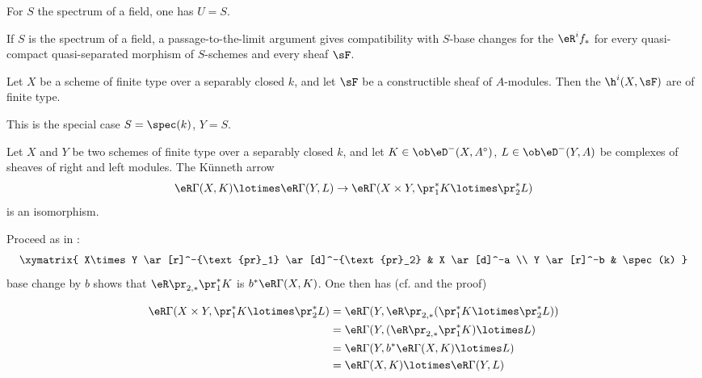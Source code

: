 For $S$ the spectrum of a field, one has $U=S$.

If $S$ is the spectrum of a field, a passage-to-the-limit argument gives
compatibility with $S$-base changes for the $\eR^i f_\ast$ for every
quasi-compact quasi-separated morphism of $S$-schemes and every sheaf $\sF$.






\begin{corollary_}\label{VII:1-10}
Let $X$ be a scheme of finite type over a separably closed $k$, and let
$\sF$ be a constructible sheaf of $A$-modules. Then the $\h^i(X,\sF)$ are of
finite type.
\end{corollary_}

This is the special case $S=\spec(k)$, $Y=S$.

\begin{corollary_}\label{VII:1-11}
Let $X$ and $Y$ be two schemes of finite type over a separably closed $k$,
and let $K\in \ob\eD^-(X,A^\circ)$,
$L\in \ob\eD^-(Y,A)$ be complexes of sheaves of right and left modules. The
K\"unneth arrow
\[
  \eR \Gamma(X,K) \lotimes \eR \Gamma(Y,L) \to \eR\Gamma(X\times Y,\pr_1^\ast K \lotimes \pr_2^\ast L)
\]
is an isomorphism.
\end{corollary_}

Proceed as in :
\[\xymatrix{
  X\times Y \ar[r]^-{\text{pr}_1} \ar[d]^-{\text{pr}_2}
    & X \ar[d]^-a \\
  Y \ar[r]^-b
    & \spec(k)
}\]
base change by $b$ shows that $\eR\pr_{2,\ast}{} \pr_1^\ast K$ is
$b^\ast \eR\Gamma(X,K)$. One then has (cf.
 and the proof)

\begin{align*}
  \eR\Gamma(X\times Y,\pr_1^\ast K\lotimes \pr_2^\ast L)
    &= \eR\Gamma(Y,\eR \pr_{2,\ast}(\pr_1^\ast K\lotimes \pr_2^\ast L)) \\
    &= \eR\Gamma(Y,(\eR\pr_{2,\ast}\pr_1^\ast K)\lotimes L) \\
    &= \eR\Gamma(Y,b^\ast \eR\Gamma(X,K)\lotimes L) \\
    &= \eR\Gamma(X,K)\lotimes \eR\Gamma(Y,L)
\end{align*}






\subsection{}\label{VII:1-12}

